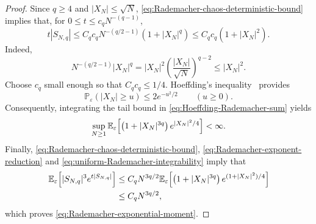 \documentclass[../CLT_SYK.tex]{subfiles}
\begin{document}
\begin{proof}
  Since $q\geq4$ and $|X_N|\leq\sqrt N$,
  \eqref{eq:Rademacher-chaos-deterministic-bound} implies that, for $0\leq t\leq c_qN^{-(q-1)}$,
  \begin{equation}
    t|S_{N,q}|
    \leq
      C_q c_q N^{-(q/2-1)} \left(1 + |X_N|^q\right)
    \leq
      C_q c_q \left(1 + |X_N|^2\right).
    \label{eq:Rademacher-exponent-reduction}
  \end{equation}
  Indeed,
  \begin{equation*}
    N^{-(q/2-1)}|X_N|^q
    =|X_N|^2
    \left(\frac{|X_N|}{\sqrt N}\right)^{q-2}
    \leq |X_N|^2.
  \end{equation*}
  Choose $c_q$ small enough so that $C_q c_q\leq 1/4$.  Hoeffding's inequality~\cite[Theorem~2]{Hoeffding1963} provides
  \begin{equation}\label{eq:Hoeffding-Rademacher-sum}
    \mathbb P_\varepsilon(|X_N|\geq u)
    \leq
      2e^{-u^2/2}
    \qquad
    (u\geq0).
  \end{equation}
  Consequently, integrating the tail bound in \eqref{eq:Hoeffding-Rademacher-sum} yields
  \begin{equation}\label{eq:uniform-Rademacher-integrability}
    \sup_{N\geq1}
    \E_\varepsilon\mleft[
      \left(1+|X_N|^{3q}\right)
      e^{|X_N|^2/4}
    \mright]
    <
    \infty.
  \end{equation}
  Finally, \eqref{eq:Rademacher-chaos-deterministic-bound}, \eqref{eq:Rademacher-exponent-reduction} and \eqref{eq:uniform-Rademacher-integrability} imply that
  \begin{align*}
    \E_\varepsilon\mleft[
      |S_{N,q}|^3e^{t|S_{N,q}|}
    \mright]
    &\leq
    C_qN^{3q/2}
    \E_\varepsilon\mleft[
      \left(1+|X_N|^{3q}\right)
      e^{(1+|X_N|^2)/4}
    \mright] \\
    &\leq C_qN^{3q/2},
  \end{align*}
  which proves \eqref{eq:Rademacher-exponential-moment}.
\end{proof}
\end{document}
